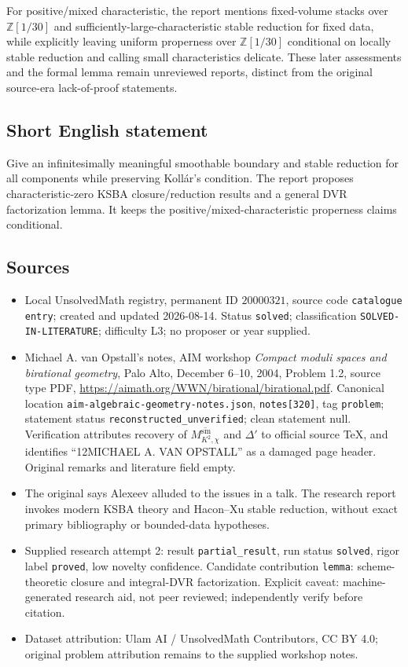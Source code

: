 \documentclass[11pt]{article}
\newcommand{\Z}{\mathbb{Z}}
\begin{document}
For positive/mixed characteristic, the report mentions fixed-volume stacks over $\Z[1/30]$ and sufficiently-large-characteristic stable reduction for fixed data, while explicitly leaving uniform properness over $\Z[1/30]$ conditional on locally stable reduction and calling small characteristics delicate. These later assessments and the formal lemma remain unreviewed reports, distinct from the original source-era lack-of-proof statements.
\subsection{Short English statement}
Give an infinitesimally meaningful smoothable boundary and stable reduction for all components while preserving Kollár's condition. The report proposes characteristic-zero KSBA closure/reduction results and a general DVR factorization lemma. It keeps the positive/mixed-characteristic properness claims conditional.
\subsection{Sources}
\begin{itemize}
\item Local UnsolvedMath registry, permanent ID $20000321$, source code \texttt{catalogue entry}; created and updated 2026-08-14. Status \texttt{solved}; classification \texttt{SOLVED-IN-LITERATURE}; difficulty L3; no proposer or year supplied.
\item Michael A. van Opstall's notes, AIM workshop \emph{Compact moduli spaces and birational geometry}, Palo Alto, December 6--10, 2004, Problem 1.2, source type PDF, \url{https://aimath.org/WWN/birational/birational.pdf}. Canonical location \texttt{aim-algebraic-geometry-notes.json}, \texttt{notes[320]}, tag \texttt{problem}; statement status \texttt{reconstructed\_unverified}; clean statement null. Verification attributes recovery of $\overline{M^{\mathrm{sm}}_{K^2,\chi}}$ and $\Delta'$ to official source TeX, and identifies ``12MICHAEL A. VAN OPSTALL'' as a damaged page header. Original remarks and literature field empty.
\item The original says Alexeev alluded to the issues in a talk. The research report invokes modern KSBA theory and Hacon--Xu stable reduction, without exact primary bibliography or bounded-data hypotheses.
\item Supplied research attempt 2: result \texttt{partial\_result}, run status \texttt{solved}, rigor label \texttt{proved}, low novelty confidence. Candidate contribution \texttt{lemma}: scheme-theoretic closure and integral-DVR factorization. Explicit caveat: machine-generated research aid, not peer reviewed; independently verify before citation.
\item Dataset attribution: Ulam AI / UnsolvedMath Contributors, CC BY 4.0; original problem attribution remains to the supplied workshop notes.
\end{itemize}
\end{document}
